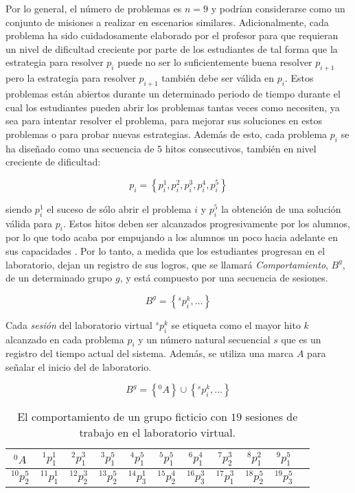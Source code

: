 Por lo general, el número de problemas es $n = 9$ y podrían considerarse como un conjunto de misiones a realizar en escenarios similares. Adicionalmente, cada problema ha sido cuidadosamente elaborado por el profesor para que requieran un nivel de dificultad creciente por parte de los estudiantes de tal forma que la estrategia para resolver $p_i$ puede no ser lo suficientemente buena resolver $p_{i+1}$ pero la estrategia para resolver $p_{i+1}$ también debe ser válida en $p_i$. Estos problemas están abiertos durante un determinado periodo de tiempo durante el cual los estudiantes pueden abrir los problemas tantas veces como necesiten, ya sea para intentar resolver el problema, para mejorar sus soluciones en estos problemas o para probar nuevas estrategias. Además de esto, cada problema $p_i$ se ha diseñado como una secuencia de $5$ hitos consecutivos, también en nivel creciente de dificultad:

\begin{equation}
p_i = \left\lbrace p_i^1 , p_i^2 , p_i^3 , p_i^4 , p_i^5 \right\rbrace
\end{equation}

siendo $p_i^1$ el suceso de sólo abrir el problema $i$ y $p_i^5$ la obtención de una solución válida para $p_i$. Estos hitos deben ser alcanzados progresivamente por los alumnos, por lo que todo acaba por empujando a los alumnos un poco hacia adelante en sus capacidades \cite{Keller_1968}. Por lo tanto, a medida que los estudiantes progresan en el laboratorio, dejan un registro de sus logros, que se llamará \emph{Comportamiento}, $B^g$, de un determinado grupo $g$, y está compuesto por una secuencia de sesiones.

\begin{equation}
B^g = \left\lbrace ^sp_i^k,\dots \right\rbrace
\end{equation}

Cada \emph{sesión} del laboratorio virtual $^sp_i^k$ se etiqueta como el mayor hito $k$ alcanzado en cada problema $p_i$ y un número natural secuencial $s$ que es un registro del tiempo actual del sistema. Además, se utiliza una marca $A$ para señalar el inicio del de laboratorio.

\begin{equation}
B^g = \left\lbrace ^0A \right\rbrace \cup \left\lbrace ^sp_i^k,\dots \right\rbrace
\end{equation}

\begin{table}[H]
\centering
\caption{El comportamiento de un grupo ficticio con $19$ sesiones de trabajo en el laboratorio virtual.}
\label{tab:sequence}
\begin{tabular}{ccccccccccc}
$^0A$ & $^1p_1^1$ & $^2p_1^3$ & $^3p_1^5$ & $^4p_1^5$ & $^5p_1^5$ & $^6p_1^4$ & $^7p_2^3$ & $^8p_1^2$ & $^9p_1^5$ \\ \hline
$^{10}p_2^5$  & $^{11}p_1^1$ & $^{12}p_2^3$ & $^{13}p_2^5$ & $^{14}p_3^1$ & $^{15}p_2^4$ & $^{16}p_3^3$ & $^{17}p_1^3$ & $^{18}p_2^5$ & $^{19}p_3^5$
\end{tabular}
\end{table}

